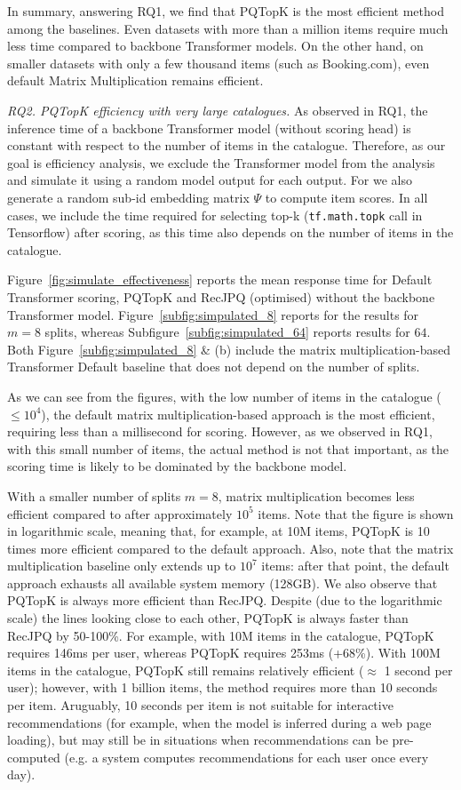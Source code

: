 \documentclass[sigconf,natbib=true, review=true]{acmart} %
\newcommand{\rsasha}[1]{\textcolor[HTML]{FF0000}{#1}}
\begin{document}
In summary, answering RQ1, we find that PQTopK is the most efficient method among the baselines. Even datasets with more than a million items require much less time compared to backbone Transformer models. On the other hand, on smaller datasets with only a few thousand items (such as Booking.com), even default Matrix Multiplication remains efficient. 

\textit{RQ2. PQTopK efficiency with very large catalogues.} As observed in RQ1, the inference time of a backbone Transformer model (without scoring head) is constant with respect to the number of items in the catalogue. Therefore, as our goal is efficiency analysis, we exclude the Transformer model from the analysis and simulate it using a random model output for each output. For we also generate a random sub-id embedding matrix $\Psi$ to compute item scores. In all cases, we include the time required for selecting top-k (\rsasha{\texttt{tf.math.topk} call in Tensorflow}) after scoring, as this time also depends on the number of items in the catalogue. 

Figure~\ref{fig:simulate_effectiveness} reports the mean response time for Default Transformer scoring, PQTopK and RecJPQ (optimised) without the backbone Transformer model. Figure~\ref{subfig:simpulated_8} reports for the results for $m=8$ splits, whereas Subfigure~\ref{subfig:simpulated_64} reports results for $64$. Both Figure~\ref{subfig:simpulated_8} \& (b) include the matrix multiplication-based Transformer Default baseline that does not depend on the number of splits. 

As we can see from the figures, with the low number of items in the catalogue ($\leq 10^4$), the default matrix multiplication-based approach is the most efficient, requiring less than a millisecond for scoring. However, as we observed in RQ1, with this small number of items, the actual method is not that important, as the scoring time is likely to be dominated by the backbone model. 

With a smaller number of splits $m=8$, matrix multiplication becomes less efficient compared to after approximately $10^5$ items. Note that the figure is shown in logarithmic scale, meaning that, for example, at 10M items, PQTopK is 10 times more efficient compared to the default approach. Also, note that the matrix multiplication baseline only extends up to $10^7$ items: after that point, the default approach exhausts all available system memory (128GB). We also observe that PQTopK is always more efficient than RecJPQ. Despite (due to the logarithmic scale) the lines looking close to each other, PQTopK is always faster than RecJPQ by 50-100\%. For example, with 10M items in the catalogue, PQTopK requires 146ms per user, whereas PQTopK requires 253ms (+68\%). With 100M items in the catalogue, PQTopK still remains relatively efficient ($\approx$ 1 second per user); however, with 1 billion items, the method requires more than 10 seconds per item. \rsasha{Aruguably, 10 seconds per item is not suitable for interactive recommendations (for example, when the model is inferred during a web page loading), but may still be in situations when recommendations can be pre-computed (e.g. a system computes recommendations for each user once every day). }
\end{document}
